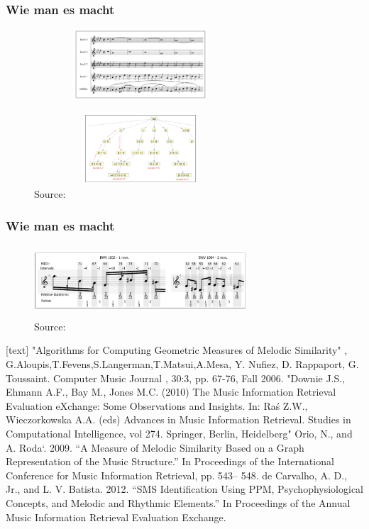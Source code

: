 \documentclass{beamer}
\begin{document}
	\begin{frame}
		\frametitle{Wie man es macht}
		\begin{figure}[h!]
					\includegraphics[width=300px,height=100px,keepaspectratio]{one_of_two_point_four}
		\end{figure}
		\begin{figure}[h!]
					\includegraphics[width=300px,height=100px,keepaspectratio]{two_of_two_point_four}
					\caption{Source: \cite{two_point_four}}

		\end{figure}
	\end{frame}
	\begin{frame}
		\frametitle{Wie man es macht}
		\begin{figure}[h!]
					\includegraphics[width=300px,height=100px,keepaspectratio]{one_of_two_point_seven}
					\caption{Source: \cite{two_point_seven}}
		\end{figure}
	\end{frame}


	\begin{frame}
		\begin{thebibliography}{9}
			[text]
			 "Algorithms for Computing Geometric Measures of  Melodic Similarity" , G.Aloupis,T.Fevens,S.Langerman,T.Matsui,A.Mesa, Y. Nufiez, D. Rappaport, G. Toussaint. Computer Music Journal , 30:3, pp. 67-76, Fall 2006.
			 "Downie J.S., Ehmann A.F., Bay M., Jones M.C. (2010) The Music Information Retrieval Evaluation eXchange: Some Observations and Insights. In: Raś Z.W., Wieczorkowska A.A. (eds) Advances in Music Information Retrieval. Studies in Computational Intelligence, vol 274. Springer, Berlin, Heidelberg"
			 Orio, N., and A. Roda`. 2009. “A Measure of Melodic Similarity Based on a Graph Representation of the Music Structure.” In Proceedings of the International Conference for Music Information Retrieval, pp. 543– 548.
			 de Carvalho, A. D., Jr., and L. V. Batista. 2012. “SMS Identification Using PPM, Psychophysiological Concepts, and Melodic and Rhythmic Elements.” In Proceedings of the Annual Music Information Retrieval Evaluation Exchange.
		\end{thebibliography}
	\end{frame}
\end{document}
